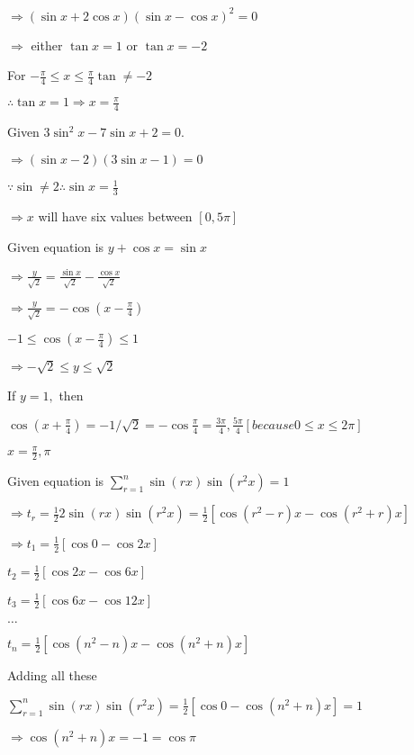   $\Rightarrow (\sin x + 2\cos x)(\sin x - \cos x)^2 = 0$

  $\Rightarrow$ either $\tan x = 1$ or $\tan x = -2$

  For $-\frac{\pi}{4}\leq x\leq \frac{\pi}{4} \tan \neq -2$

  $\therefore \tan x = 1 \Rightarrow x = \frac{\pi}{4}$

\item Given $3\sin^2x - 7\sin x + 2 = 0.$

  $\Rightarrow (\sin x - 2)(3\sin x - 1) = 0$

  $\because \sin \neq 2 \therefore \sin x = \frac{1}{3}$

  $\Rightarrow x$ will have six values between $[0, 5\pi]$

\item Given equation is $y + \cos x = \sin x$

  $\Rightarrow \frac{y}{\sqrt{2}} = \frac{\sin x}{\sqrt{2}} - \frac{\cos x}{\sqrt{2}}$

  $\Rightarrow \frac{y}{\sqrt{2}} = -\cos\left(x - \frac{\pi}{4}\right)$

  $-1 \leq \cos\left(x - \frac{\pi}{4}\right)\leq 1$

  $\Rightarrow -\sqrt{2}\leq y \leq \sqrt{2}$

  If $y = 1,$ then

  $\cos\left(x + \frac{\pi}{4}\right) = -1/\sqrt{2} = -\cos\frac{\pi}{4} = \frac{3\pi}{4}, \frac{5\pi}{4}[because 0\leq
    x\leq 2\pi]$

  $x = \frac{\pi}{2}, \pi$

\item Given equation is $\sum_{r = 1}^n\sin(rx)\sin(r^2x) = 1$

  $\Rightarrow t_r = \frac{1}{2}2\sin(rx)\sin(r^2x) = \frac{1}{2}[\cos(r^2 - r)x - \cos(r^2 + r)x]$

  $\Rightarrow t_1 = \frac{1}{2}[\cos0 - \cos2x]$

  $t_2 = \frac{1}{2}[\cos2x - \cos6x]$

  $t_3 = \frac{1}{2}[\cos6x - \cos12x]$

  $\ldots$

  $t_n = \frac{1}{2}[\cos(n^2 - n)x - \cos(n^2 + n)x]$

  Adding all these

  $\sum_{r = 1}^n\sin(rx)\sin(r^2x) = \frac{1}{2}[\cos0 - \cos(n^2 + n)x] = 1$

  $\Rightarrow \cos(n^2+ n)x = -1 = \cos\pi$

